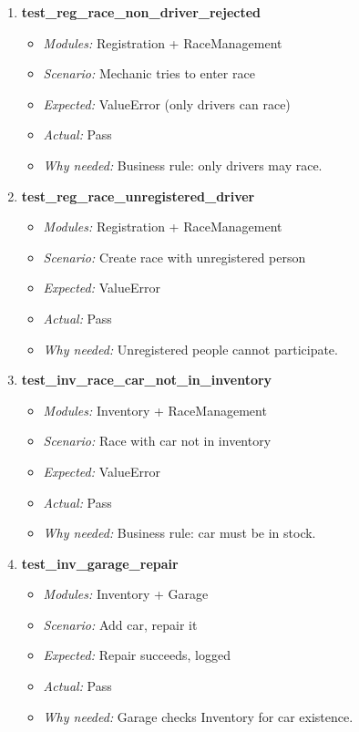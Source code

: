 \documentclass{article}
\begin{document}
\begin{enumerate}[resume, label=\textbf{TC\arabic*.}]
\item \textbf{test\_reg\_race\_non\_driver\_rejected}
\begin{itemize}[noitemsep]
  \item \textit{Modules:} Registration + RaceManagement
  \item \textit{Scenario:} Mechanic tries to enter race
  \item \textit{Expected:} ValueError (only drivers can race)
  \item \textit{Actual:} Pass
  \item \textit{Why needed:} Business rule: only drivers may race.
\end{itemize}

\item \textbf{test\_reg\_race\_unregistered\_driver}
\begin{itemize}[noitemsep]
  \item \textit{Modules:} Registration + RaceManagement
  \item \textit{Scenario:} Create race with unregistered person
  \item \textit{Expected:} ValueError
  \item \textit{Actual:} Pass
  \item \textit{Why needed:} Unregistered people cannot participate.
\end{itemize}

\item \textbf{test\_inv\_race\_car\_not\_in\_inventory}
\begin{itemize}[noitemsep]
  \item \textit{Modules:} Inventory + RaceManagement
  \item \textit{Scenario:} Race with car not in inventory
  \item \textit{Expected:} ValueError
  \item \textit{Actual:} Pass
  \item \textit{Why needed:} Business rule: car must be in stock.
\end{itemize}

\item \textbf{test\_inv\_garage\_repair}
\begin{itemize}[noitemsep]
  \item \textit{Modules:} Inventory + Garage
  \item \textit{Scenario:} Add car, repair it
  \item \textit{Expected:} Repair succeeds, logged
  \item \textit{Actual:} Pass
  \item \textit{Why needed:} Garage checks Inventory for car existence.
\end{itemize}


\end{enumerate}
\end{document}
